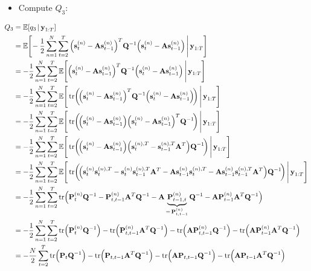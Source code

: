		\begin{itemize}
			\item Compute \(Q_3\):
		\end{itemize}
		\begin{align*}
			Q_3
				&= \E[q_3 \given \vec{y}_{1:T}] \\
				&= \E\Bigg[\! -\frac{1}{2} \sum_{n = 1}^{N} \sum_{t = 2}^{T} \Big( \vec{s}_t^{(n)} - \mat{A} \vec{s}_{t - 1}^{(n)} \Big)^T \mat{Q}^{-1} \Big( \vec{s}_t^{(n)} - \mat{A} \vec{s}_{t - 1}^{(n)} \Big) \Bigggiven \vec{y}_{1:T} \Bigg] \\
				&= -\frac{1}{2} \sum_{n = 1}^{N} \sum_{t = 2}^{T} \E\Bigg[ \Big( \vec{s}_t^{(n)} - \mat{A} \vec{s}_{t - 1}^{(n)} \Big)^T \mat{Q}^{-1} \Big( \vec{s}_t^{(n)} - \mat{A} \vec{s}_{t - 1}^{(n)} \Big) \Bigggiven \vec{y}_{1:T} \Bigg] \\
				&= -\frac{1}{2} \sum_{n = 1}^{N} \sum_{t = 2}^{T} \E\Bigg[ \tr\!\bigg(\!\Big( \vec{s}_t^{(n)} - \mat{A} \vec{s}_{t - 1}^{(n)} \Big)^T \mat{Q}^{-1} \Big( \vec{s}_t^{(n)} - \mat{A} \vec{s}_{t - 1}^{(n)} \Big)\!\bigg) \Bigggiven \vec{y}_{1:T} \Bigg] \\
				&= -\frac{1}{2} \sum_{n = 1}^{N} \sum_{t = 2}^{T} \E\Bigg[ \tr\!\bigg(\!\Big( \vec{s}_t^{(n)} - \mat{A} \vec{s}_{t - 1}^{(n)} \Big) \Big( \vec{s}_t^{(n)} - \mat{A} \vec{s}_{t - 1}^{(n)} \Big)^T \mat{Q}^{-1} \!\bigg) \Bigggiven \vec{y}_{1:T} \Bigg] \\
				&= -\frac{1}{2} \sum_{n = 1}^{N} \sum_{t = 2}^{T} \E\Bigg[ \tr\!\bigg(\!\Big( \vec{s}_t^{(n)} - \mat{A} \vec{s}_{t - 1}^{(n)} \Big) \Big(\vec{s}_t^{(n), T} - \vec{s}_{t - 1}^{(n), T} \mat{A}^T \Big) \mat{Q}^{-1} \!\bigg) \Bigggiven \vec{y}_{1:T} \Bigg] \\
				&= -\frac{1}{2} \sum_{n = 1}^{N} \sum_{t = 2}^{T} \E\Bigg[ \tr\!\bigg(\!\Big( \vec{s}_t^{(n)} \vec{s}_t^{(n), T} - \vec{s}_t^{(n)} \vec{s}_{t - 1}^{(n), T} \mat{A}^T - \mat{A} \vec{s}_{t - 1}^{(n)} \vec{s}_t^{(n), T} - \mat{A} \vec{s}_{t - 1}^{(n)} \vec{s}_{t - 1}^{(n), T} \mat{A}^T \Big) \mat{Q}^{-1} \!\bigg) \Bigggiven \vec{y}_{1:T} \Bigg] \\
				&= -\frac{1}{2} \sum_{n = 1}^{N} \sum_{t = 2}^{T} \tr\!\Big( \mat{P}_t^{(n)} \mat{Q}^{-1} - \mat{P}_{t, t - 1}^{(n)} \mat{A}^T \mat{Q}^{-1} - \mat{A} \underbrace{\mat{P}_{t - 1, t}^{(n)}}_{=\, \mat{P}_{t, t - 1}^{(n)}} \mat{Q}^{-1} - \mat{A} \mat{P}_{t - 1}^{(n)} \mat{A}^T \mat{Q}^{-1} \Big) \\
				&= -\frac{1}{2} \sum_{n = 1}^{N} \sum_{t = 2}^{T} \tr\!\Big( \mat{P}_t^{(n)} \mat{Q}^{-1} \Big) - \tr\!\Big( \mat{P}_{t, t - 1}^{(n)} \mat{A}^T \mat{Q}^{-1} \Big) - \tr\!\Big( \mat{A} \mat{P}_{t, t - 1}^{(n)} \mat{Q}^{-1} \Big) - \tr\!\Big( \mat{A} \mat{P}_{t - 1}^{(n)} \mat{A}^T \mat{Q}^{-1} \Big) \\
				&= -\frac{N}{2} \sum_{t = 2}^{T} \tr\!\Big( \mat{P}_t \mat{Q}^{-1} \Big) - \tr\!\Big( \mat{P}_{t, t - 1} \mat{A}^T \mat{Q}^{-1} \Big) - \tr\!\Big( \mat{A} \mat{P}_{t, t - 1} \mat{Q}^{-1} \Big) - \tr\!\Big( \mat{A} \mat{P}_{t - 1} \mat{A}^T \mat{Q}^{-1} \Big)
		\end{align*}
		\vfill
		\pagebreak


